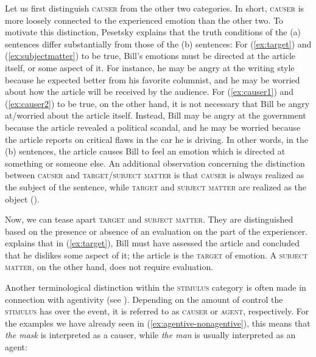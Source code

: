 \noindent Let us first distinguish \textsc{causer} from the other two categories. In short, \textsc{causer} is more loosely connected to the experienced emotion than the other two. 
To motivate this distinction, Pesetsky explains that the truth conditions of the (a) sentences differ substantially from those of the (b) sentences: 
For (\ref{ex:target}) and (\ref{ex:subjectmatter}) to be true,  Bill's emotions must be directed at the article itself, or some aspect of it. For instance, he may be angry at the writing style because he expected better from his favorite columnist, and he may be worried about how the article will be received by the audience. 
For (\ref{ex:causer1}) and (\ref{ex:causer2}) to be true, on the other hand, it is not necessary that Bill be angry at/worried about the article itself. Instead, Bill may be angry at the government because the article revealed a political scandal, and he may be worried because the article reports on critical flaws in the car he is driving. In other words, in the (b) sentences, the article causes Bill to feel an emotion which is directed at something or someone else.
An additional observation concerning the distinction between \textsc{causer} and \textsc{target/subject matter} is that \textsc{causer} is always realized as the subject of the sentence, while \textsc{target} and \textsc{subject matter} are realized as the object (\citealt[56]{Pesetsky.1995}).

Now, we can tease apart \textsc{target} and \textsc{subject matter}. They are distinguished based on the presence or absence of an evaluation on the part of the experiencer. \citet[56]{Pesetsky.1995} explains that in (\ref{ex:target}), Bill must have assessed the article and concluded that he dislikes some aspect of it; the article is the \textsc{target} of emotion. A \textsc{subject matter}, on the other hand, does not require evaluation.

\begin{sloppypar}
Another terminological distinction within the \textsc{stimulus} category is often made in connection with agentivity (see ). Depending on the amount of control the \textsc{stimulus} has over the event, it is referred to as \textsc{causer} or \textsc{agent}, respectively. For the examples we have already seen in (\ref{ex:agentive-nonagentive}), this means that \textit{the mask} is interpreted as a causer, while \textit{the man} is usually interpreted as an agent:  
\end{sloppypar}

